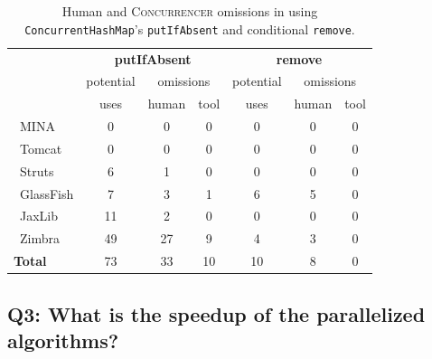 \documentclass[10pt,twocolumn]{article}
\newcommand{\toolx}{{\smaller\textsc{Concurrencer}}\xspace}
\begin{document}
\begin{table}
\centering
\begin{scriptsize}
\begin{tabular}{l|ccc|ccc}
             & \multicolumn{3}{|c|}{\textbf{putIfAbsent}}  	&\multicolumn{3}{|c}{\textbf{remove}} \\
             & potential &  \multicolumn{2}{c|}{omissions}           	& potential  & \multicolumn{2}{c}{omissions} \\
             & uses   & human     & tool        	&   uses   & human  & tool  \\ \hline
\ MINA     	&  0       	&  0            &  0                &  0         &  0         &  0  \\
\ Tomcat    &  0      	&  0          	&  0                &  0         &  0         &  0  \\             
\ Struts    &  6      	&  1            &  0                &  0         &  0         &  0  \\
\ GlassFish &  7       	&  3            &  1                &  6         &  5         &  0  \\
\ JaxLib    &  11      	&  2            &  0                &  0         &  0         &  0  \\
\ Zimbra    &  49      	&  27           &  9                &  4         &  3         &  0  \\ \hline
\textbf{Total}& 73      &  33           & 10                & 10         &  8         &  0 \\
\end{tabular}
\caption{Human and \toolx omissions in using
\texttt{ConcurrentHashMap}'s \texttt{putIfAbsent} and conditional \texttt{remove}.}
\label{tab:ImproperCHMUsages}
\end{scriptsize}
\end{table}



\subsection{Q3: What is the speedup of the parallelized algorithms?}
\end{document}

